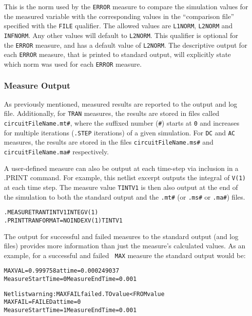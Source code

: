 \begin{Command}
\begin{Arguments}
This is the norm used by the {\tt ERROR} measure to compare the
simulation values for the measured variable with the corresponding
values in the ``comparison file'' specified with the {\tt FILE}
qualifier.  The allowed values are {\tt L1NORM}, {\tt L2NORM} and {\tt
INFNORM}.  Any other values will default to {\tt L2NORM}.  This
qualifier is optional for the {\tt ERROR} measure, and has a default
value of {\tt L2NORM}.  The descriptive output for each {\tt ERROR}
measure, that is printed to standard output, will explicitly state
which norm was used for each {\tt ERROR} measure.

\end{Arguments}

\end {Command}

\subsubsection{Measure Output}
\label{Measure_Measurement_Output}
As previously mentioned, measured results are reported to the output
and log file.  Additionally, for \texttt{TRAN} measures, the results
are stored in files called
\texttt{circuitFileName.mt\#}, where the suffixed number (\texttt{\#}) starts
at \texttt{0} and increases for multiple iterations (\texttt{.STEP}
iterations) of a given simulation. For \texttt{DC} and \texttt{AC}
measures, the results are stored in the
files \texttt{circuitFileName.ms\#} and \texttt{circuitFileName.ma\#}
respectively.

A user-defined measure can also be output at each time-step via
inclusion in a .PRINT command.  For example, this netlist excerpt
outputs the integral of {\tt V(1)} at each time step.  The measure
value {\tt TINTV1} is then also output at the end of the simulation to
both the standard output and the \texttt{.mt\#} (or \texttt{.ms\#}
or \texttt{.ma\#}) files.
\begin{alltt}
.MEASURE TRAN TINTV1 INTEG V(1)
.PRINT TRAN FORMAT=NOINDEX V(1) TINTV1
\end{alltt}

The output for successful and failed measures to the standard output
(and log files) provides more information than just the measure's
calculated values.  As an example, for a successful and failed {\tt
MAX} measure the standard output would be:

\begin{alltt}
MAXVAL = 0.999758 at time = 0.000249037
Measure Start Time= 0	Measure End Time= 0.001

Netlist warning: MAXFAIL failed. TO value < FROM value
MAXFAIL = FAILED at time = 0
Measure Start Time= 1	Measure End Time= 0.001
\end{alltt}

